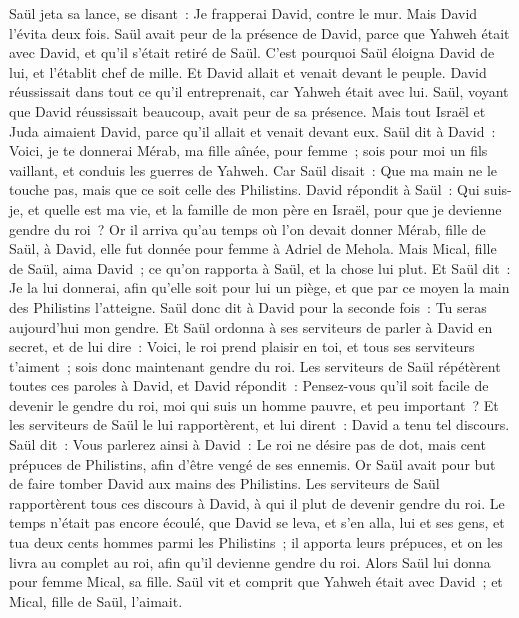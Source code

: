 \begin{multicols}{2}
Saül jeta sa lance, se disant~: Je frapperai David, contre le mur. Mais David l'évita deux fois.
Saül avait peur de la présence de David, parce que Yahweh était avec David, et qu'il s'était retiré de Saül.
C'est pourquoi Saül éloigna David de lui, et l'établit chef de mille. Et David allait et venait devant le peuple.
David réussissait dans tout ce qu'il entreprenait, car Yahweh était avec lui.
Saül, voyant que David réussissait beaucoup, avait peur de sa présence.
Mais tout Israël et Juda aimaient David, parce qu'il allait et venait devant eux.
Saül dit à David~: Voici, je te donnerai Mérab, ma fille aînée, pour femme~; sois pour moi un fils vaillant, et conduis les guerres de Yahweh. Car Saül disait~: Que ma main ne le touche pas, mais que ce soit celle des Philistins.
David répondit à Saül~: Qui suis-je, et quelle est ma vie, et la famille de mon père en Israël, pour que je devienne gendre du roi~?
Or il arriva qu'au temps où l'on devait donner Mérab, fille de Saül, à David, elle fut donnée pour femme à Adriel de Mehola.
Mais Mical, fille de Saül, aima David~; ce qu'on rapporta à Saül, et la chose lui plut.
Et Saül dit~: Je la lui donnerai, afin qu'elle soit pour lui un piège, et que par ce moyen la main des Philistins l'atteigne. Saül donc dit à David pour la seconde fois~: Tu seras aujourd'hui mon gendre.
Et Saül ordonna à ses serviteurs de parler à David en secret, et de lui dire~: Voici, le roi prend plaisir en toi, et tous ses serviteurs t'aiment~; sois donc maintenant gendre du roi.
Les serviteurs de Saül répétèrent toutes ces paroles à David, et David répondit~: Pensez-vous qu'il soit facile de devenir le gendre du roi, moi qui suis un homme pauvre, et peu important~?
Et les serviteurs de Saül le lui rapportèrent, et lui dirent~: David a tenu tel discours.
Saül dit~: Vous parlerez ainsi à David~: Le roi ne désire pas de dot, mais cent prépuces de Philistins, afin d'être vengé de ses ennemis. Or Saül avait pour but de faire tomber David aux mains des Philistins.
Les serviteurs de Saül rapportèrent tous ces discours à David, à qui il plut de devenir gendre du roi. Le temps n'était pas encore écoulé,
que David se leva, et s'en alla, lui et ses gens, et tua deux cents hommes parmi les Philistins~; il apporta leurs prépuces, et on les livra au complet au roi, afin qu'il devienne gendre du roi. Alors Saül lui donna pour femme Mical, sa fille.
Saül vit et comprit que Yahweh était avec David~; et Mical, fille de Saül, l'aimait.

\end{multicols}

